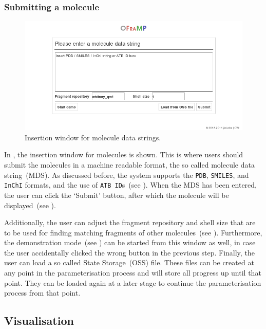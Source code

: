 \subsubsection{Submitting a molecule}

\begin{figure}
\center
\includegraphics[width=.9\textwidth]{img/impl_inserting.png}
\caption{Insertion window for molecule data strings.}
\end{figure}

In , the insertion window for molecules is shown. This is where users should submit the molecules in a machine readable format, the so called molecule data string~(MDS). As discussed before, the system supports the \verb|PDB|, \verb|SMILES|, and \verb|InChI| formats, and the use of \verb|ATB ID|s~(see ). When the MDS has been entered, the user can click the `Submit' button, after which the molecule will be displayed~(see ).

Additionally, the user can adjust the fragment repository and shell size that are to be used for finding matching fragments of other molecules~(see ). Furthermore, the demonstration mode~(see ) can be started from this window as well, in case the user accidentally clicked the wrong button in the previous step. Finally, the user can load a so called \oframp{} State Storage~(OSS) file. These files can be created at any point in the parameterisation process and will store all progress up until that point. They can be loaded again at a later stage to continue the parameterisation process from that point.


\subsection{Visualisation}

